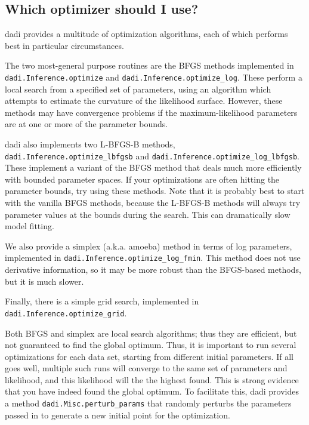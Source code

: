 \documentclass[12pt]{article}
\makeatletter
\newcommand{\dadi}{dadi\xspace}
\newcommand{\py}[1]{\lstinline[language=Python, showstringspaces=False]@#1@}
\makeatother
\begin{document}
\subsection{Which optimizer should I use?}\label{sec:which_optimizer}

\dadi provides a multitude of optimization algorithms, each of which performs best in particular circumstances.

The two most-general purpose routines are the BFGS methods implemented in \py{dadi.Inference.optimize} and \py{dadi.Inference.optimize_log}.
These perform a local search from a specified set of parameters, using an algorithm which attempts to estimate the curvature of the likelihood surface.
However, these methods may have convergence problems if the maximum-likelihood parameters are at one or more of the parameter bounds.

\dadi also implements two L-BFGS-B methods, \py{dadi.Inference.optimize_lbfgsb} and \py{dadi.Inference.optimize_log_lbfgsb}.
These implement a variant of the BFGS method that deals much more efficiently with bounded parameter spaces.
If your optimizations are often hitting the parameter bounds, try using these methods.
Note that it is probably best to start with the vanilla BFGS methods, because the L-BFGS-B methods will always try parameter values at the bounds during the search.
This can dramatically slow model fitting.

We also provide a simplex (a.k.a. amoeba) method in terms of log parameters, implemented in \py{dadi.Inference.optimize_log_fmin}.
This method does not use derivative information, so it may be more robust than the BFGS-based methods, but it is much slower.

Finally, there is a simple grid search, implemented in \py{dadi.Inference.optimize_grid}.

Both BFGS and simplex are local search algorithms; thus they are efficient, but not guaranteed to find the global optimum.
Thus, it is important to run several optimizations for each data set, starting from different initial parameters.
If all goes well, multiple such runs will converge to the same set of parameters and likelihood, and this likelihood will the the highest found.
This is strong evidence that you have indeed found the global optimum.
To facilitate this, \dadi provides a method \py{dadi.Misc.perturb_params} that randomly perturbs the parameters passed in to generate a new initial point for the optimization.

\end{document}
